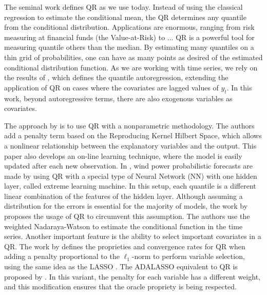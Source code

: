 


The seminal work \cite{koenker1978regression} defines QR as we use today. Instead of using the classical regression to estimate the conditional mean, the QR determines any quantile from the conditional distribution. Applications 
are enormous, ranging from risk measuring at financial funds (the Value-at-Risk) to  ... 
QR is a powerful tool for measuring quantile others than the median. By estimating many quantiles on a thin grid of probabilities, one can have as many points as desired of the estimated conditional distribution function.
As we are working with time series, we rely on the results of \cite{koenker_quantile_2006}, which defines the quantile autoregression, extending the application of QR on cases where the covariates are lagged values of $y_t$. In this work, beyond autoregressive terms, there are also exogenous variables as covariates. 





The approach by \cite{gallego2016line} is to use QR with a nonparametric methodology. The authors add a penalty term based on the Reproducing Kernel Hilbert Space, which allows a nonlinear relationship between the explanatory variables and the output. This paper also develops an on-line learning technique, where the model is easily updated after each new observation.
In \cite{wan_direct_2017}, wind power probabilistic forecasts are made by using QR with a special type of Neural Network (NN) with one hidden layer, called extreme learning machine. In this setup, each quantile is a different linear combination of the features of the hidden layer.
Although assuming a distribution for the errors is essential for the majority of models, the work by \cite{cai_regression_2002} proposes the usage of QR to circumvent this assumption. The authors use the weighted Nadaraya-Watson to estimate the conditional function in the time series.
Another important feature is the ability to select important covariates in a QR.  
The work by \cite{belloni_l1-penalized_2009} defines the proprieties and convergence rates for QR when adding a penalty proportional to the $\ell_1$-norm to perform variable selection, using the same idea as the LASSO \cite{tibshirani1996regression}. The ADALASSO equivalent to QR is proposed by \cite{ciuperca_adaptive_2016}. In this variant, the penalty for each variable has a different weight, and this modification ensures that the oracle propriety is being respected.


